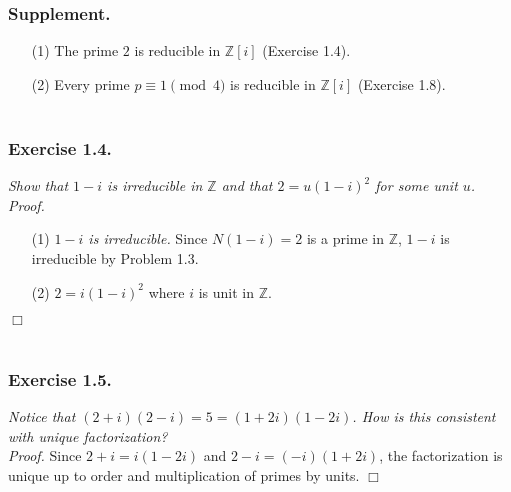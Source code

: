 \documentclass{article}
\begin{document}
\subsubsection*{Supplement.}
\begin{enumerate}
\item[(1)]
The prime $2$ is reducible in $\mathbb{Z}[i]$ (Exercise 1.4).
\item[(2)]
Every prime $p \equiv 1 \pmod{4}$ is reducible in $\mathbb{Z}[i]$ (Exercise 1.8). \\\\
\end{enumerate}






\subsubsection*{Exercise 1.4.}
\emph{Show that $1-i$ is irreducible in $\mathbb{Z}$
and that $2 = u(1-i)^2$ for some unit $u$.} \\

\emph{Proof.}
\begin{enumerate}
\item[(1)]
\emph{$1-i$ is irreducible.}
Since $N(1-i) = 2$ is a prime in $\mathbb{Z}$,
$1-i$ is irreducible by Problem 1.3.
\item[(2)]
$2 = i(1-i)^2$ where $i$ is unit in $\mathbb{Z}$.
\end{enumerate}
$\Box$ \\\\






\subsubsection*{Exercise 1.5.}
\emph{Notice that
$(2+i)(2-i) = 5 = (1+2i)(1-2i)$.
How is this consistent with unique factorization?} \\

\emph{Proof.}
Since $2+i = i(1-2i)$ and $2-i = (-i)(1+2i)$,
the factorization is unique up to order and multiplication of primes by units.
$\Box$ \\\\
\end{document}
